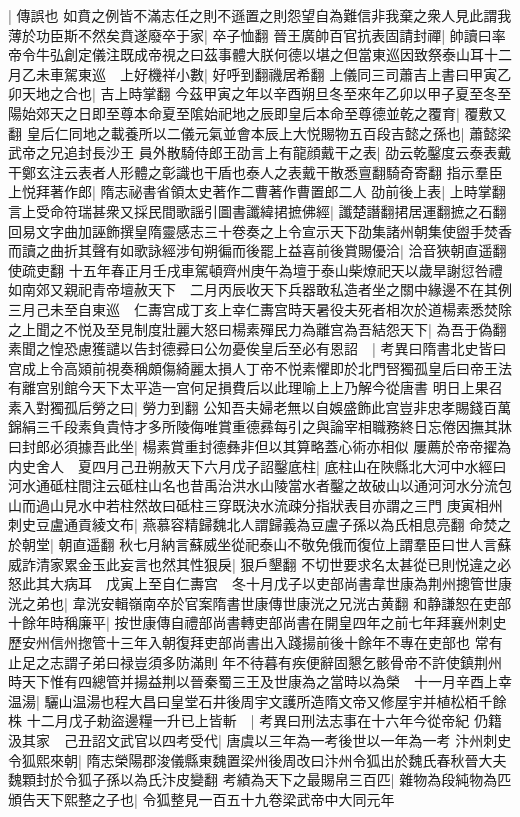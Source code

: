 |{
	傳誤也}
如賁之例皆不滿志任之則不遜置之則怨望自為難信非我棄之衆人見此謂我薄於功臣斯不然矣賁遂廢卒于家|{
	卒子恤翻}
晉王廣帥百官抗表固請封禪|{
	帥讀曰率}
帝令牛弘創定儀注既成帝視之曰茲事體大朕何德以堪之但當東巡因致祭泰山耳十二月乙未車駕東巡　上好機祥小數|{
	好呼到翻禨居希翻}
上儀同三司蕭吉上書曰甲寅乙卯天地之合也|{
	吉上時掌翻}
今茲甲寅之年以辛酉朔旦冬至來年乙卯以甲子夏至冬至陽始郊天之日即至尊本命夏至隂始祀地之辰即皇后本命至尊德並乾之覆育|{
	覆敷又翻}
皇后仁同地之載養所以二儀元氣並會本辰上大悦賜物五百段吉懿之孫也|{
	蕭懿梁武帝之兄追封長沙王}
員外散騎侍郎王劭言上有龍顔戴干之表|{
	劭云乾鑿度云泰表戴干鄭玄注云表者人形體之彰識也干盾也泰人之表戴干散悉亶翻騎奇寄翻}
指示羣臣上悦拜著作郎|{
	隋志祕書省領太史著作二曹著作曹置郎二人}
劭前後上表|{
	上時掌翻}
言上受命符瑞甚衆又採民間歌謡引圖書讖緯捃摭佛經|{
	讖楚譖翻捃居運翻摭之石翻}
回易文字曲加誣飾撰皇隋靈感志三十卷奏之上令宣示天下劭集諸州朝集使盥手焚香而讀之曲折其聲有如歌詠經涉旬朔徧而後罷上益喜前後賞賜優洽|{
	洽音狹朝直遥翻使疏吏翻}
十五年春正月壬戌車駕頓齊州庚午為壇于泰山柴燎祀天以歲旱謝愆咎禮如南郊又親祀青帝壇赦天下　二月丙辰收天下兵器敢私造者坐之關中緣邊不在其例　三月己未至自東巡　仁夀宫成丁亥上幸仁夀宫時天暑役夫死者相次於道楊素悉焚除之上聞之不悦及至見制度壯麗大怒曰楊素殫民力為離宫為吾結怨天下|{
	為吾于偽翻}
素聞之惶恐慮獲譴以告封德彛曰公勿憂俟皇后至必有恩詔　|{
	考異曰隋書北史皆曰宫成上令高熲前視奏稱頗傷綺麗太損人丁帝不悦素懼即於北門唘獨孤皇后曰帝王法有離宫别館今天下太平造一宫何足損費后以此理喻上上乃解今從唐書}
明日上果召素入對獨孤后勞之曰|{
	勞力到翻}
公知吾夫婦老無以自娛盛飾此宫豈非忠孝賜錢百萬錦絹三千段素負貴恃才多所陵侮唯賞重德彞每引之與論宰相職務終日忘倦因撫其牀曰封郎必須據吾此坐|{
	楊素賞重封德彝非但以其算略蓋心術亦相似}
屢薦於帝帝擢為内史舍人　夏四月己丑朔赦天下六月戊子詔鑿底柱|{
	底柱山在陜縣北大河中水經曰河水通砥柱間注云砥柱山名也昔禹治洪水山陵當水者鑿之故破山以通河河水分流包山而過山見水中若柱然故曰砥柱三穿既決水流疎分指狀表目亦謂之三門}
庚寅相州刺史豆盧通貢綾文布|{
	燕慕容精歸魏北人謂歸義為豆盧子孫以為氏相息亮翻}
命焚之於朝堂|{
	朝直遥翻}
秋七月納言蘇威坐從祀泰山不敬免俄而復位上謂羣臣曰世人言蘇威詐清家累金玉此妄言也然其性狠戾|{
	狠戶墾翻}
不切世要求名太甚從已則悦違之必怒此其大病耳　戊寅上至自仁夀宫　冬十月戊子以吏部尚書韋世康為荆州摠管世康洸之弟也|{
	韋洸安輯嶺南卒於官案隋書世康傳世康洸之兄洸古黄翻}
和静謙恕在吏部十餘年時稱廉平|{
	按世康傳自禮部尚書轉吏部尚書在開皇四年之前七年拜襄州刺史歷安州信州揔管十三年入朝復拜吏部尚書出入踐揚前後十餘年不專在吏部也}
常有止足之志謂子弟曰禄豈須多防滿則年不待暮有疾便辭固懇乞骸骨帝不許使鎮荆州時天下惟有四總管并揚益荆以晉秦蜀三王及世康為之當時以為榮　十一月辛酉上幸温湯|{
	驪山温湯也程大昌曰皇堂石井後周宇文護所造隋文帝又修屋宇并植松栢千餘株}
十二月戊子勅盜邊糧一升已上皆斬　|{
	考異曰刑法志事在十六年今從帝紀}
仍籍汲其家　己丑詔文武官以四考受代|{
	唐虞以三年為一考後世以一年為一考}
汴州刺史令狐熙來朝|{
	隋志榮陽郡浚儀縣東魏置梁州後周改曰汴州令狐出於魏氏春秋晉大夫魏顆封於令狐子孫以為氏汴皮變翻}
考績為天下之最賜帛三百匹|{
	雜物為段純物為匹}
頒告天下熙整之子也|{
	令狐整見一百五十九卷梁武帝中大同元年}


